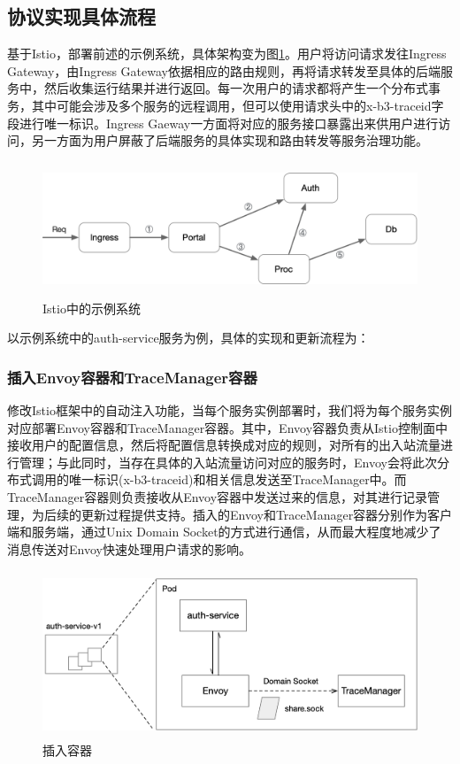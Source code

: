 \documentclass[12pt,a4paper]{article}
\theoremstyle{definition}
\begin{document}
\subsection{协议实现具体流程}
基于Istio，部署前述的示例系统，具体架构变为图\ref{fig:demo_arch_on_istio}。用户将访问请求发往Ingress Gateway，由Ingress Gateway依据相应的路由规则，再将请求转发至具体的后端服务中，然后收集运行结果并进行返回。每一次用户的请求都将产生一个分布式事务，其中可能会涉及多个服务的远程调用，但可以使用请求头中的x-b3-traceid字段进行唯一标识。Ingress Gaeway一方面将对应的服务接口暴露出来供用户进行访问，另一方面为用户屏蔽了后端服务的具体实现和路由转发等服务治理功能。

\begin{figure}[ht]
 \centering
 \includegraphics[height=4cm]{images/demo_arch_on_istio.png}
 \caption{Istio中的示例系统}
 \label{fig:demo_arch_on_istio}
\end{figure}

以示例系统中的auth-service服务为例，具体的实现和更新流程为：
\subsubsection{插入Envoy容器和TraceManager容器}
修改Istio框架中的自动注入功能，当每个服务实例部署时，我们将为每个服务实例对应部署Envoy容器和TraceManager容器。其中，Envoy容器负责从Istio控制面中接收用户的配置信息，然后将配置信息转换成对应的规则，对所有的出入站流量进行管理；与此同时，当存在具体的入站流量访问对应的服务时，Envoy会将此次分布式调用的唯一标识(x-b3-traceid)和相关信息发送至TraceManager中。而TraceManager容器则负责接收从Envoy容器中发送过来的信息，对其进行记录管理，为后续的更新过程提供支持。插入的Envoy和TraceManager容器分别作为客户端和服务端，通过Unix Domain Socket的方式进行通信，从而最大程度地减少了消息传送对Envoy快速处理用户请求的影响。
\begin{figure}[ht]
 \centering
 \includegraphics[height=5cm]{images/insert_containers.png}
 \caption{插入容器}
 \label{fig:insert_containers}
\end{figure}
\end{document}
